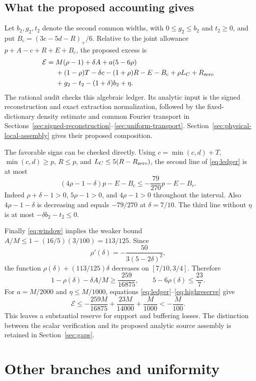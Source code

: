 \documentclass[11pt]{article}
\theoremstyle{definition}
\begin{document}
\subsection{What the proposed accounting gives}
Let $b_2,g_2,t_2$ denote the second common widths, with
$0\le g_2\le b_2$ and $t_2\ge0$, and put
$B_c=(3c-5d-R)_+/6$. Relative to the joint allowance
$p+A-c+R+E+B_c$, the proposed excess is
\begin{align}\label{eq:ledger}
 \mathcal E={}&M(\rho-1)+\delta A+a(5-6\rho)\notag\\
 &+(1-\rho)T-\delta c-(1+\rho)R-E-B_c
      +\rho L_C+R_{\rm zero}\notag\\
 &+g_2-t_2-(1+\delta)b_2+\eta.
\end{align}
The rational audit checks this algebraic ledger. Its analytic input is
the signed reconstruction and exact extraction normalization, followed by
the fixed-dictionary density estimate and common Fourier transport in
Sections~\ref{sec:signed-reconstruction}--\ref{sec:uniform-transport}.
Section~\ref{sec:physical-local-assembly} gives their proposed composition.

The favorable signs can be checked directly. Using
$c=\min(c,d)+T$, $\min(c,d)\ge p$, $R\le p$, and
$L_C\le5(R-R_{\rm zero})$, the second line of \eqref{eq:ledger} is at
most
\[
 (4\rho-1-\delta)p-E-B_c
 \le-\frac{79}{270}p-E-B_c.
\]
Indeed $\rho+\delta-1>0$, $5\rho-1>0$, and $4\rho-1>0$ throughout
the interval. Also $4\rho-1-\delta$ is decreasing and equals
$-79/270$ at $\delta=7/10$. The third line without $\eta$ is at most
$-\delta b_2-t_2\le0$.

Finally \eqref{eq:window} implies the weaker bound
$A/M\le1-(16/5)(3/100)=113/125$. Since
\[
 \rho'(\delta)=-\frac{50}{3(5-2\delta)^2},
\]
the function $\rho(\delta)+(113/125)\delta$ decreases on
$[7/10,3/4]$. Therefore
\begin{equation}\label{eq:highreserve}
 1-\rho(\delta)-\delta A/M\ge\frac{259}{16875},\qquad
 5-6\rho(\delta)\le\frac{23}{7}.
\end{equation}
For $a=M/2000$ and $\eta\le M/1000$, equations
\eqref{eq:ledger}--\eqref{eq:highreserve} give
\[
 \mathcal E\le
 -\frac{259M}{16875}+\frac{23M}{14000}+\frac M{1000}
 <-\frac M{100}.
\]
This leaves a substantial reserve for support and buffering losses.
The distinction between the scalar verification and its proposed analytic
source assembly is retained in Section~\ref{sec:gaps}.

\section{Other branches and uniformity}\label{sec:interfaces}
\end{document}
